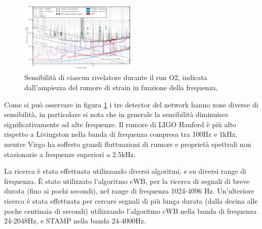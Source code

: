 \begin{figure}
	\vspace{-20pt}
	\begin{center}
		\includegraphics[width=0.5\textwidth]{figures/Capitolo_2/GW170817_spectral_limits.pdf}
	\end{center}
	\vspace{-5pt}
	\caption{Sensibilità di ciascun rivelatore durante il run O2, indicata dall'ampiezza del rumore di strain in funzione della frequenza, \cite{Abbott_2017b}}
	\label{fig:NoiseFrequenze}
	\vspace{-10pt}
\end{figure}
Come si può osservare in figura \ref{fig:NoiseFrequenze} i tre detector del network hanno zone diverse di sensibilità, in particolare si nota che in generale la sensibilità diminuisce significativamente ad alte frequenze. Il rumore di LIGO Hanford è più alto rispetto a Livingston nella banda di frequenza compresa tra 100Hz e 1kHz, mentre Virgo ha sofferto grandi fluttuazioni di rumore e proprietà spettrali non stazionarie a frequenze superiori a 2.5kHz. 

La ricerca è stata effettuata utilizzando diversi algoritmi, e su diversi range di frequenza. È stato utilizzato l'algoritmo cWB, per la ricerca di segnali di breve durata (fino ai pochi secondi), nel range di frequenza 1024-4096 Hz. 
Un'ulteriore ricerca è stata effettuata per cercare segnali di più lunga durata (dalla decina alle poche centinaia di secondi) utilizzando l'algoritmo cWB nella banda di frequenza 24-2048Hz, e STAMP nella banda 24-4000Hz.

